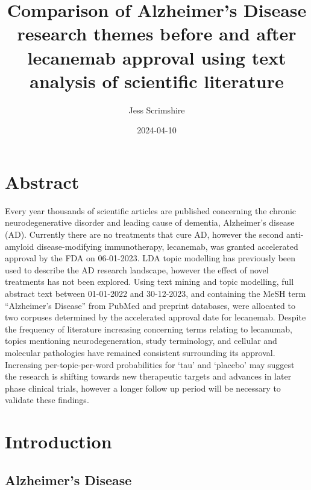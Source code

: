 \documentclass[
  a4paper,
]{article}
\title{Comparison of Alzheimer's Disease research themes before and
after lecanemab approval using text analysis of scientific literature}
\author{Jess Scrimshire}
\date{2024-04-10}
\renewcommand*\contentsname{Table of contents}
\newcommand\contentsname{Table of contents}
\begin{document}
\maketitle
\ifdefined\Shaded\renewenvironment{Shaded}{\begin{tcolorbox}[borderline west={3pt}{0pt}{shadecolor}, interior hidden, enhanced, sharp corners, boxrule=0pt, frame hidden, breakable]}{\end{tcolorbox}}\fi

\renewcommand*\contentsname{Table of contents}
{
\hypersetup{linkcolor=}
\setcounter{tocdepth}{3}
\tableofcontents
}
\hypertarget{abstract}{%
\section{Abstract}\label{abstract}}

Every year thousands of scientific articles are published concerning the
chronic neurodegenerative disorder and leading cause of dementia,
Alzheimer's disease (AD). Currently there are no treatments that cure
AD, however the second anti-amyloid disease-modifying immunotherapy,
lecanemab, was granted accelerated approval by the FDA on 06-01-2023.
LDA topic modelling has previously been used to describe the AD research
landscape, however the effect of novel treatments has not been explored.
Using text mining and topic modelling, full abstract text between
01-01-2022 and 30-12-2023, and containing the MeSH term ``Alzheimer's
Disease'' from PubMed and preprint databases, were allocated to two
corpuses determined by the accelerated approval date for lecanemab.
Despite the frequency of literature increasing concerning terms relating
to lecanumab, topics mentioning neurodegeneration, study terminology,
and cellular and molecular pathologies have remained consistent
surrounding its approval. Increasing per-topic-per-word probabilities
for `tau' and `placebo' may suggest the research is shifting towards new
therapeutic targets and advances in later phase clinical trials, however
a longer follow up period will be necessary to validate these findings.

\hypertarget{introduction}{%
\section{Introduction}\label{introduction}}

\hypertarget{alzheimers-disease}{%
\subsection{Alzheimer's Disease}\label{alzheimers-disease}}
\end{document}
